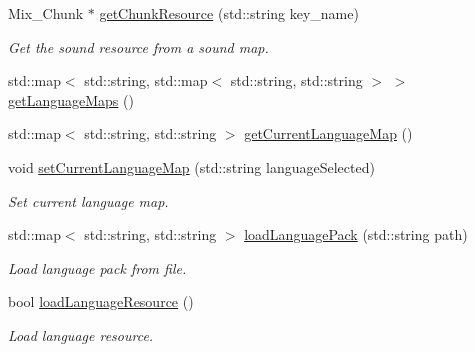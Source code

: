 \begin{DoxyCompactItemize}
Mix\+\_\+\+Chunk $\ast$ \mbox{\hyperlink{class_resource_manager_a68e2e20a3c93082296f6a71b19c6f59f}{get\+Chunk\+Resource}} (std\+::string key\+\_\+name)
\begin{DoxyCompactList}\small\item\em Get the sound resource from a sound map. \end{DoxyCompactList}\item 
std\+::map$<$ std\+::string, std\+::map$<$ std\+::string, std\+::string $>$ $>$ \mbox{\hyperlink{class_resource_manager_a5a6ad6ed582ab791a9139efa2d7b25c5}{get\+Language\+Maps}} ()
\item 
std\+::map$<$ std\+::string, std\+::string $>$ \mbox{\hyperlink{class_resource_manager_acab1c7790fd7571c07766e7426fc05ce}{get\+Current\+Language\+Map}} ()
\item 
\mbox{\label{class_resource_manager_ab7ae94a67ba1dc14e0473c37e81a7cdd}} 
void \mbox{\hyperlink{class_resource_manager_ab7ae94a67ba1dc14e0473c37e81a7cdd}{set\+Current\+Language\+Map}} (std\+::string language\+Selected)
\begin{DoxyCompactList}\small\item\em Set current language map. \end{DoxyCompactList}\item 
\mbox{\label{class_resource_manager_a7f6776dc6c3da8699427f58df1bbe5c2}} 
std\+::map$<$ std\+::string, std\+::string $>$ \mbox{\hyperlink{class_resource_manager_a7f6776dc6c3da8699427f58df1bbe5c2}{load\+Language\+Pack}} (std\+::string path)
\begin{DoxyCompactList}\small\item\em Load language pack from file. \end{DoxyCompactList}\item 
\mbox{\label{class_resource_manager_a593a518707d1f4a364ca24f2851cb0b9}} 
bool \mbox{\hyperlink{class_resource_manager_a593a518707d1f4a364ca24f2851cb0b9}{load\+Language\+Resource}} ()
\begin{DoxyCompactList}\small\item\em Load language resource. \end{DoxyCompactList}\end{DoxyCompactItemize}
